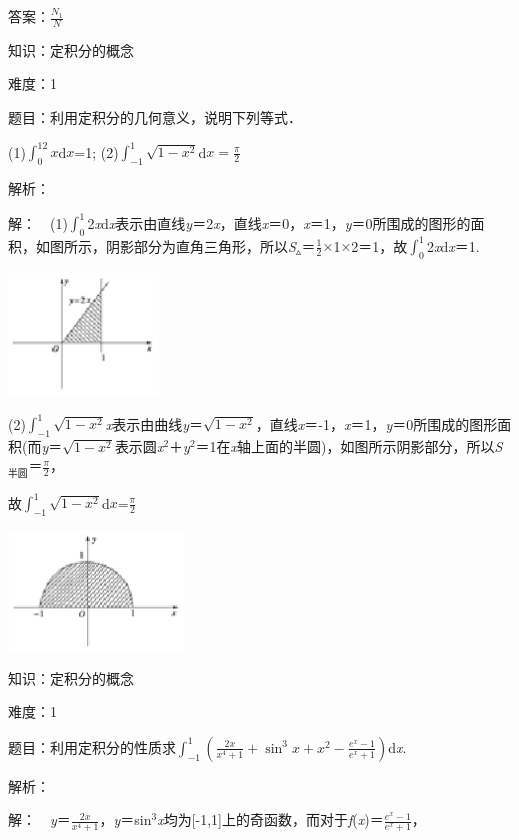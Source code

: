 \documentclass{article} %
\begin{document}
 答案：$\frac{N_1}{N}$

 

 知识：定积分的概念

 难度：1

 题目：利用定积分的几何意义，说明下列等式．

 (1)$\int_0^12x$d$x$=1; (2)$\int_{-1}^{1}\sqrt{1-x^2}$d$x=\frac{\pi}{2}$

 解析： 

 解：　(1)$\int_0^1$2\textit{x}d\textit{x}表示由直线\textit{y}＝2\textit{x}，直线\textit{x}＝0，\textit{x}＝1，\textit{y}＝0所围成的图形的面积，如图所示，阴影部分为直角三角形，所以\textit{S}${}_{\mathrm{\vartriangle }}$＝$\frac{1}{2}\mathrm{\times}$1$\mathrm{\times}$2＝1，故$\int_0^1$2\textit{x}d\textit{x}＝1.

\includegraphics*[width=1.57in, height=1.27in, keepaspectratio=false]{image10}

(2)$\int_{-1}^{1}\sqrt{1-x^2}$\textit{x}表示由曲线\textit{y}＝$\sqrt{1-x^2}$，直线\textit{x}＝-1，\textit{x}＝1，\textit{y}＝0所围成的图形面积(而\textit{y}＝$\sqrt{1-x^2}$表示圆\textit{x}${}^{2}$＋\textit{y}${}^{2}$＝1在\textit{x}轴上面的半圆)，如图所示阴影部分，所以\textit{S}${}_{\textrm{半}\textrm{圆}}$＝$\frac{\pi}{2}$，

故$\int_{-1}^{1}\sqrt{1-x^2}$d$x$=$\frac{\pi}{2}$

\includegraphics*[width=1.85in, height=1.25in, keepaspectratio=false]{image12}

 知识：定积分的概念

 难度：1

 题目：利用定积分的性质求$\int_{-1}^{1}(\frac{2x}{x^4+1}+\sin^3x+x^2-\frac{e^x-1}{e^x+1})$d\textit{x}.

 解析：

 解：　\textit{y}＝$\frac{2x}{x^4+1}$，\textit{y}＝sin${}^{3}$\textit{x}均为[-1,1]上的奇函数，而对于\textit{f}(\textit{x})＝$\frac{e^x-1}{e^x+1}$，
\end{document}
